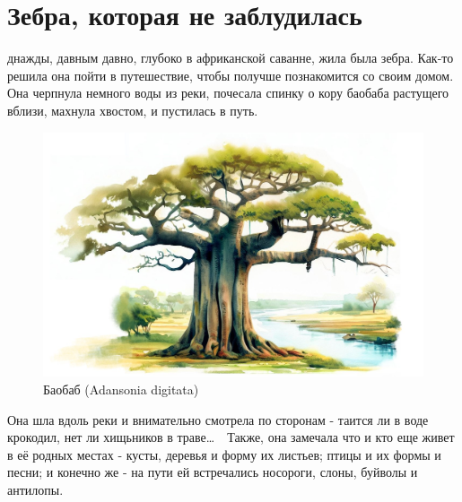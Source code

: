 \documentclass[a5paper,11pt]{memoir}
\begin{document}


\thispagestyle{empty}  %
\newpage
\thispagestyle{empty}


\renewcommand{\thefigure}{\arabic{figure}}




\section*{Зебра, которая не заблудилась}
днажды, давным давно, глубоко в африканской саванне, жила была зебра. Как-то решила она пойти в путешествие, чтобы получше познакомится со своим домом. Она черпнула немного воды из реки, почесала спинку о кору баобаба растущего вблизи, махнула хвостом, и пустилась в путь.

\begin{figure}[h]
	\hspace{-1cm}\includegraphics[width=\paperwidth]{images/baobab.jpeg}
	\caption{Баобаб (Adansonia digitata)}
\end{figure}


Она шла вдоль реки и внимательно смотрела по сторонам - таится ли в воде крокодил, нет ли хищьников в траве\ldots~\ Также, она замечала что и кто еще живет в её родных местах - кусты, деревья и форму их листьев; птицы и их формы и песни; и конечно же - на пути ей встречались носороги, слоны, буйволы и антилопы.
\end{document}
